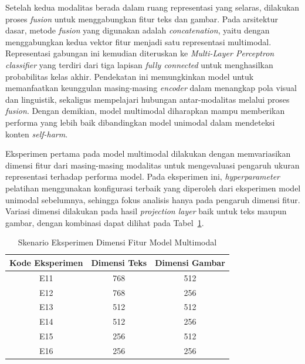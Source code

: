Setelah kedua modalitas berada dalam ruang representasi yang selaras, dilakukan proses \textit{fusion} untuk menggabungkan fitur teks dan gambar. Pada arsitektur dasar, metode \textit{fusion} yang digunakan adalah \textit{concatenation}, yaitu dengan menggabungkan kedua vektor fitur menjadi satu representasi multimodal. Representasi gabungan ini kemudian diteruskan ke \textit{Multi-Layer Perceptron} \textit{classifier} yang terdiri dari tiga lapisan \textit{fully connected} untuk menghasilkan probabilitas kelas akhir. Pendekatan ini memungkinkan model untuk memanfaatkan keunggulan masing-masing \textit{encoder} dalam menangkap pola visual dan linguistik, sekaligus mempelajari hubungan antar-modalitas melalui proses \textit{fusion}. Dengan demikian, model multimodal diharapkan mampu memberikan performa yang lebih baik dibandingkan model unimodal dalam mendeteksi konten \textit{self-harm}.

Eksperimen pertama pada model multimodal dilakukan dengan memvariasikan dimensi fitur dari masing-masing modalitas untuk mengevaluasi pengaruh ukuran representasi terhadap performa model. Pada eksperimen ini, \textit{hyperparameter} pelatihan menggunakan konfigurasi terbaik yang diperoleh dari eksperimen model unimodal sebelumnya, sehingga fokus analisis hanya pada pengaruh dimensi fitur. Variasi dimensi dilakukan pada hasil \textit{projection layer} baik untuk teks maupun gambar, dengan kombinasi dapat dilihat pada Tabel~\ref{tabel:variasi_dimensi_fitur_multimodal}.

\begin{table}[H]
    \centering
    \caption{Skenario Eksperimen Dimensi Fitur Model Multimodal}
    \label{tabel:variasi_dimensi_fitur_multimodal}
    \small
    \setlength{\tabcolsep}{8pt}
    \renewcommand{\arraystretch}{1.1}
    \begin{tabular}{c c c}
        \hline
        \textbf{Kode Eksperimen} & \textbf{Dimensi Teks} & \textbf{Dimensi Gambar} \\
        \hline
        E11 & 768 & 512 \\
        E12 & 768 & 256 \\
        E13 & 512 & 512 \\
        E14 & 512 & 256 \\
        E15 & 256 & 512 \\
        E16 & 256 & 256 \\
        \hline
    \end{tabular}
\end{table}

